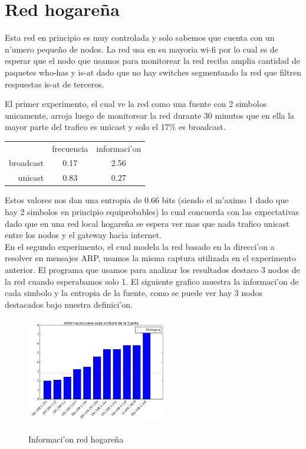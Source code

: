 \section{Red hogare\~na}
Esta red en principio es muy controlada y solo sabemos que cuenta con un n'umero peque\~no de nodos. La red usa
en su mayoria wi-fi por lo cual es de esperar que el nodo que usamos para monitorear la red reciba amplia cantidad de
paquetes who-has y is-at dado que no hay switches segmentando la red que filtren respuestas is-at de terceros.

El primer experimento, el cual ve la red como una fuente con 2 simbolos unicamente, arroja luego de monitorear la red durante
30 minutos que en ella  la mayor parte del trafico es unicast y solo el 17\% es broadcast.

\begin{tabular}{ r|c|c| }
\multicolumn{1}{r}{}
 &  \multicolumn{1}{c}{frecuencia}
 & \multicolumn{1}{c}{informaci'on} \\
\cline{2-3}
broadcast & 0.17 & 2.56 \\
\cline{2-3}
unicast & 0.83 & 0.27 \\
\cline{2-3}
\end{tabular}
 
Estos valores nos dan una entropia de 0.66 bits (siendo el m'aximo 1 dado que hay 2 simbolos en principio equiprobables) lo
 cual concuerda con las expectativas dado que en una red local hogare\~na se espera ver mas que nada trafico unicast entre
 los nodos y el gateway hacia internet.\\
 
En el segundo experimento, el cual modela la red basado en la direcci'on a resolver en mensajes ARP, usamos la misma captura
utilizada en el experimento anterior. El programa que usamos para analizar los resultados destaco 3 nodos de la red cuando
esperabamos solo 1. El siguiente grafico muestra la informaci'on de cada simbolo y la entropia de la fuente, como se puede
ver hay 3 nodos destacados bajo nuestra definici'on.\\
 
\begin{figure}[!h]
\centering
\caption{Informaci'on red hogare\~na}
\includegraphics[width=0.55\textwidth]{red1_info}
 \label{fig:red1info}
\end{figure}

